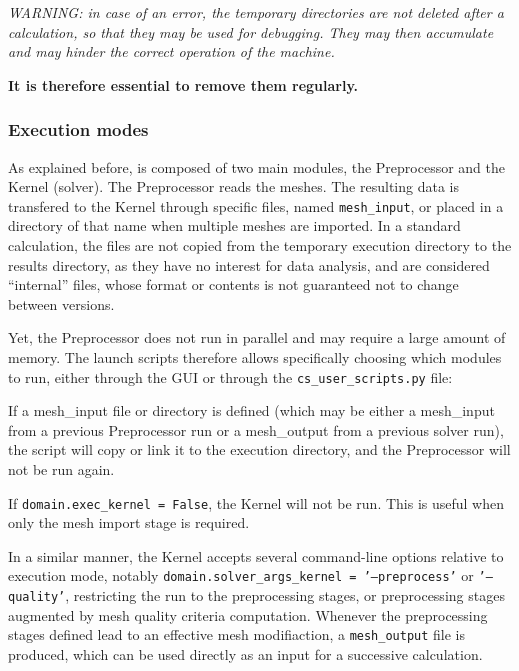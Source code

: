 {{{\noindent
{\em WARNING: in case of an error, the temporary directories are not deleted
after a calculation, so that they may be used for debugging. They may then
accumulate and may hinder the correct operation of the machine.\\
\centerline{\bf It is therefore essential to remove them regularly.}}


\subsubsection{Execution modes}
\label{prg_executionmodes}%
As explained before, \CS is composed of two main modules, the Preprocessor and the
Kernel (solver). The Preprocessor reads the meshes.
The resulting data is transfered to the Kernel through specific
files, named \texttt{mesh\_input}, or placed in a directory of that name when multiple meshes are imported. In a standard calculation, the files
are not copied from the temporary execution directory to the results directory,
as they have no interest for data analysis, and are considered ``internal''
files, whose format or contents is not guaranteed not to change between \CS versions.

Yet, the Preprocessor does not run in parallel and may require a
large amount of memory. The launch scripts therefore allows specifically
choosing which modules to run, either through the GUI or through the
\texttt{cs\_user\_scripts.py} file:

\hspace*{0.5cm} If a {mesh\_input} file or directory is defined (which may be
either a {mesh\_input} from a previous Preprocessor run or a {mesh\_output}
from a previous solver run), the script will copy or link it to
the execution directory, and the Preprocessor will not be run again.

\hspace*{0.5cm} If \texttt{domain.exec\_kernel = False}, the Kernel will not
be run. This is useful when only the mesh import stage is required.

In a similar manner, the Kernel accepts several command-line options relative to execution mode, notably \texttt{domain.solver\_args\_kernel = '--preprocess'} or \texttt{'--quality'}, restricting the run to the preprocessing stages, or preprocessing stages augmented by mesh quality criteria computation. Whenever the preprocessing stages defined lead to an effective mesh modifiaction, a \texttt{mesh\_output} file is produced, which can be used directly as an input for a successive calculation.

}}}

